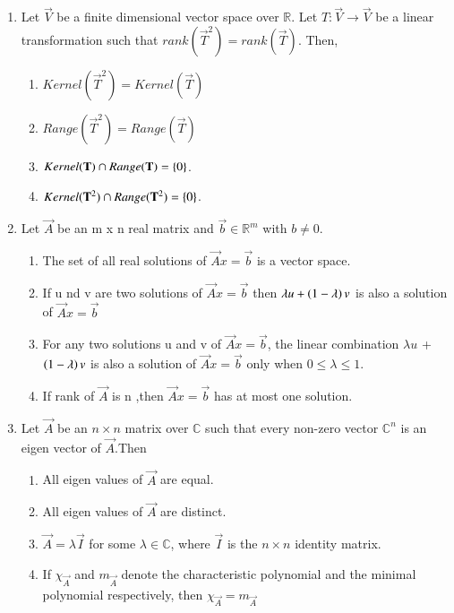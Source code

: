 \renewcommand{\theequation}{\theenumi}
\renewcommand{\thefigure}{\theenumi}
\begin{enumerate}[label=\thesection.\arabic*.,ref=\thesection.\theenumi]

%
\item Let $\vec{V}$ be a finite dimensional vector space over $\mathbb{R}$. Let $T:\vec{V}\rightarrow\vec{V}$ be a linear transformation such that $rank(\vec{T}^2)=rank(\vec{T})$. Then,
\begin{enumerate}
    \item $Kernel(\vec{T}^2)=Kernel(\vec{T})$
    \item $Range(\vec{T}^2)=Range(\vec{T})$
    \item $Kernel(\mathbf{T})\cap Range(\mathbf{T})=\left\{0\right\}$.
    \item $Kernel(\mathbf{T}^2)\cap Range(\mathbf{T}^2)=\left\{0\right\}$.
\end{enumerate}
%
\solution

\item  Let $\vec{A}$ be an m x n real matrix and $\vec{b}\in \mathbb{R}^m$ with $b\neq 0$.
\begin{enumerate}
    \item The set of all real solutions of $\vec{A}x=\vec{b}$ is a vector space.\\
    \item If u nd v are two solutions of $\vec{A}x=\vec{b}$ then $\lambda u  +\left(1-\lambda\right)v$ is also a solution of $\vec{A}x=\vec{b}$\\
    \item For any two solutions u and v of $\vec{A}x=\vec{b}$, the linear combination $\lambda u$ + $\left(1-\lambda\right)v$ is also a solution of $\vec{A}x=\vec{b}$ only when $0\leq\lambda\leq1.$\\
    \item If rank of $\vec{A}$ is n ,then $\vec{A}x=\vec{b}$ has at most one solution.\ 
    \end{enumerate}
%
\solution

\item Let $\vec{A}$ be an $n\times n$ matrix over $\mathbb{C}$ such that every non-zero vector $\mathbb{C}^n$ is an eigen vector of $\vec{A}$.Then
\begin{enumerate}
    \item All eigen values of $\vec{A}$ are equal.
    \item All eigen values of $\vec{A}$ are distinct.
    \item $\vec{A}=\lambda\vec{I}$ for some $\lambda \in \mathbb{C}$, where $\vec{I}$ is the $n\times n$ identity matrix.
    \item If $\chi_\vec{A}$ and $m_\vec{A}$ denote the characteristic polynomial and the minimal polynomial respectively, then $\chi_\vec{A}=m_\vec{A}$
\end{enumerate}
%


\end{enumerate}
